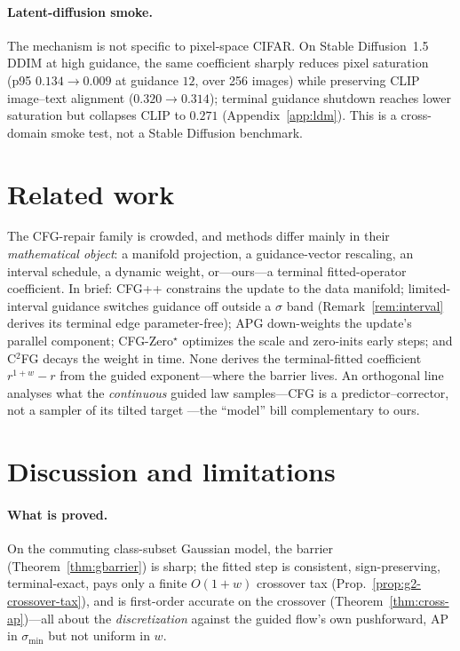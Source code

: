 \documentclass{article} %
\theoremstyle{plain}
\theoremstyle{definition}
\theoremstyle{remark}
\providecommand{\smin}{\sigma_{\min}}
\providecommand{\verify}[1]{} %
\begin{document}
\paragraph{Latent-diffusion smoke.}
The mechanism is not specific to pixel-space CIFAR.  On Stable Diffusion~1.5
DDIM at high guidance, the same coefficient sharply reduces pixel saturation
(p95 $0.134\to0.009$ at guidance $12$, over 256 images) while preserving CLIP
image--text alignment ($0.320\to0.314$); terminal guidance shutdown reaches
lower saturation but collapses CLIP to $0.271$ (Appendix~\ref{app:ldm}).  This
is a cross-domain smoke test, not a Stable Diffusion benchmark.


\section{Related work}
\label{sec:related}

The CFG-repair family is crowded, and methods differ mainly in their
\emph{mathematical object}: a manifold projection, a guidance-vector rescaling,
an interval schedule, a dynamic weight, or---ours---a terminal fitted-operator
coefficient.  In brief: CFG++ \citep{chung2025cfgpp} constrains the
update to the data manifold; limited-interval guidance
\citep{kynkaanniemi2024interval} switches guidance off outside a $\sigma$
band (Remark~\ref{rem:interval} derives its terminal edge parameter-free);
APG \citep{sadat2025apg} down-weights the update's parallel component;
CFG-Zero$^\star$ \citep{fan2025cfgzero} optimizes the scale and zero-inits
early steps; and C$^2$FG \citep{gao2026c2fg} decays the weight in time.
None derives the terminal-fitted coefficient
$r^{1+w}-r$ from the guided exponent---where the barrier lives.
An orthogonal line analyses what the \emph{continuous} guided law samples---CFG
is a predictor--corrector, not a sampler of its tilted target
\citep{bradley2024cfg,chidambaram2024cfg}---the ``model'' bill complementary to
ours.


\section{Discussion and limitations}
\label{sec:discussion}

\paragraph{What is proved.}
On the commuting class-subset Gaussian model, the barrier
(Theorem~\ref{thm:gbarrier}) is sharp; the fitted step is consistent,
sign-preserving, terminal-exact, pays only a finite $O(1+w)$ crossover tax
(Prop.~\ref{prop:g2-crossover-tax}), and is first-order accurate on the
crossover (Theorem~\ref{thm:cross-ap})---all about the \emph{discretization}
against the guided flow's own pushforward, AP in $\smin$ but not uniform in
$w$.
\end{document}
